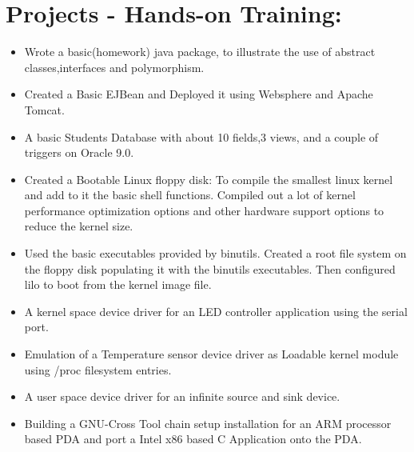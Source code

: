 \section {Projects - Hands-on Training:}
	\begin{itemize}
		\item Wrote a basic(homework) java package, to illustrate the use of abstract classes,interfaces and polymorphism.

		\item Created a Basic EJBean and Deployed it using Websphere and Apache Tomcat.

	 	\item A basic Students Database with about 10 fields,3 views, and a couple of triggers on Oracle 9.0.

	 	\item Created a Bootable Linux floppy disk: To compile the smallest linux kernel and add to it the basic shell functions. Compiled out a lot of kernel performance optimization options and other hardware support options to reduce the kernel size.

		\item Used the basic executables provided by binutils. Created a root file system on the floppy disk populating it with the binutils executables. Then configured lilo to boot from the kernel image file.

	  	\item A kernel space device driver for an LED controller application using the serial port.

		\item Emulation of a Temperature sensor device driver as Loadable kernel module using /proc filesystem entries.

	 	\item A user space device driver for an infinite source and sink device.

		\item Building a GNU-Cross Tool chain setup installation for an ARM processor based PDA and port a Intel x86 based C Application onto the PDA.
	\end{itemize}